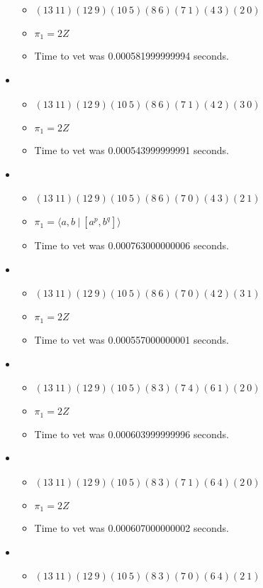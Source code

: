 \documentclass{article}
\begin{document}
\begin{itemize}
\begin{itemize}
      \item $(13\ 11)(12\ 9)(10\ 5)(8\ 6)(7\ 1)(4\ 3)(2\ 0)$
      \item $\pi_1 =2 Z$
      \item Time to vet was 0.000581999999994 seconds.
\end{itemize}
\item \begin{itemize}
      \item $(13\ 11)(12\ 9)(10\ 5)(8\ 6)(7\ 1)(4\ 2)(3\ 0)$
      \item $\pi_1 =2 Z$
      \item Time to vet was 0.000543999999991 seconds.
\end{itemize}
\item \begin{itemize}
      \item $(13\ 11)(12\ 9)(10\ 5)(8\ 6)(7\ 0)(4\ 3)(2\ 1)$
      \item $\pi_1 = \langle a,b\ |\ [a^p,b^q]\rangle$
      \item Time to vet was 0.000763000000006 seconds.
\end{itemize}
\item \begin{itemize}
      \item $(13\ 11)(12\ 9)(10\ 5)(8\ 6)(7\ 0)(4\ 2)(3\ 1)$
      \item $\pi_1 =2 Z$
      \item Time to vet was 0.000557000000001 seconds.
\end{itemize}
\item \begin{itemize}
      \item $(13\ 11)(12\ 9)(10\ 5)(8\ 3)(7\ 4)(6\ 1)(2\ 0)$
      \item $\pi_1 =2 Z$
      \item Time to vet was 0.000603999999996 seconds.
\end{itemize}
\item \begin{itemize}
      \item $(13\ 11)(12\ 9)(10\ 5)(8\ 3)(7\ 1)(6\ 4)(2\ 0)$
      \item $\pi_1 =2 Z$
      \item Time to vet was 0.000607000000002 seconds.
\end{itemize}
\item \begin{itemize}
      \item $(13\ 11)(12\ 9)(10\ 5)(8\ 3)(7\ 0)(6\ 4)(2\ 1)$

\end{itemize}
\end{itemize}
\end{document}
